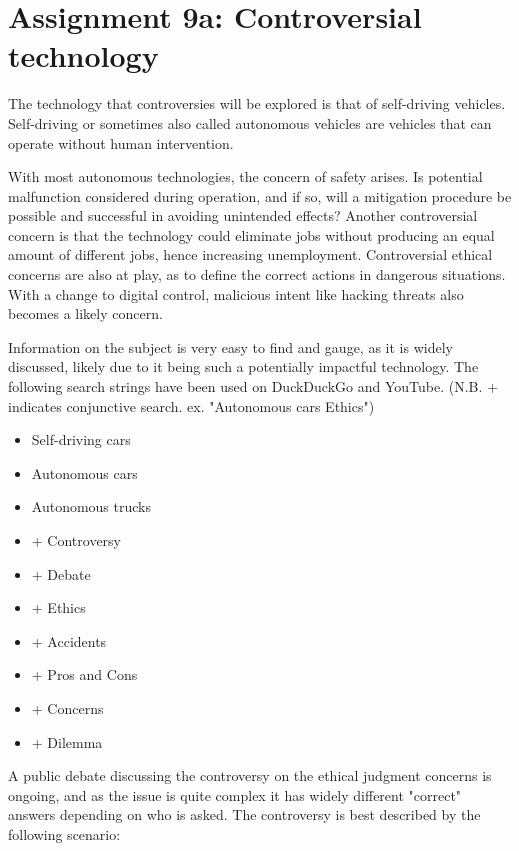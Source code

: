 \section*{Assignment 9a: Controversial technology}

The technology that controversies will be explored is that of self-driving vehicles. 
Self-driving or sometimes also called autonomous vehicles are vehicles that can operate without human intervention. 

With most autonomous technologies, the concern of safety arises. 
Is potential malfunction considered during operation, and if so, will a mitigation procedure be possible and successful in avoiding unintended effects?
Another controversial concern is that the technology could eliminate jobs without producing an equal amount of different jobs, hence increasing unemployment.
Controversial ethical concerns are also at play, as to define the correct actions in dangerous situations.
With a change to digital control, malicious intent like hacking threats also becomes a likely concern.

Information on the subject is very easy to find and gauge, as it is widely discussed, likely due to it being such a potentially impactful technology.
The following search strings have been used on DuckDuckGo and YouTube. (N.B. + indicates conjunctive search. ex. "Autonomous cars Ethics")
\begin{itemize}
    \item Self-driving cars
    \item Autonomous cars
    \item Autonomous trucks
    \item + Controversy
    \item + Debate
    \item + Ethics
    \item + Accidents
    \item + Pros and Cons
    \item + Concerns
    \item + Dilemma
\end{itemize}

A public debate discussing the controversy on the ethical judgment concerns is ongoing, and as the issue is quite complex it has widely different "correct" answers depending on who is asked.
The controversy is best described by the following scenario:

